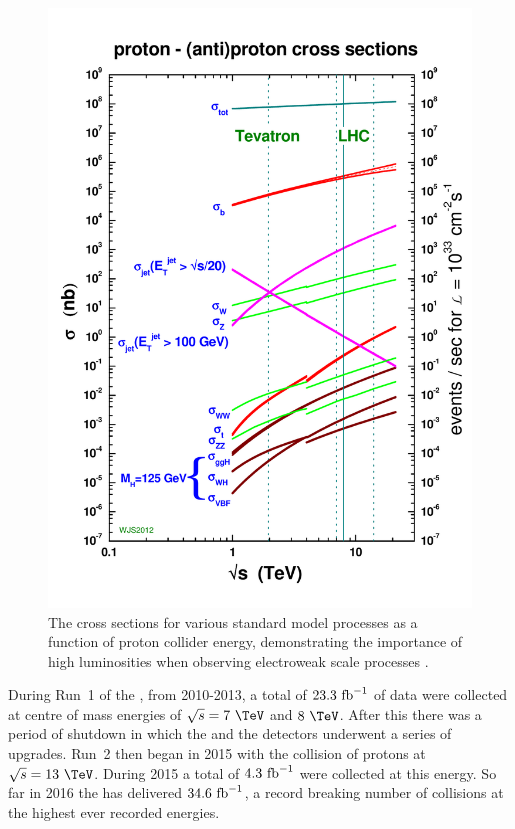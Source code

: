 \begin{figure}
  \includegraphics[width=\mediumfigwidth]{figs/crosssections2012_v5}
  \caption[]%
  { The cross sections for various standard model processes as a
  function of proton collider energy, demonstrating the importance of
  high luminosities when observing electroweak scale processes
  \cite{stirlingCrossSec1}.}%
  \label{fig:xsecs}
\end{figure}

During Run~1 of the \LHC, from 2010-2013, a total of $23.3~\text{fb}^{-1}$ of
data were collected at centre of mass energies of $\sqrt{s}=7~\tev$ and
$8~\tev$. After this there was a period of shutdown in which the \LHC
and the detectors underwent a series of upgrades. Run~2 then began in
2015 with the collision of protons at $\sqrt{s}=13~\tev$. During 2015 a
total of $4.3~\text{fb}^{-1}$ were collected at this energy. So far in 2016 the
\LHC has delivered $34.6~\text{fb}^{-1}$, a record breaking number of collisions
at the highest ever recorded energies. 

